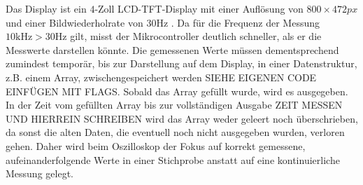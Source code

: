 Das Display ist ein $4$-Zoll LCD-TFT-Display mit einer Auflösung von \newline $800 \times 472 \si{px}$
und einer Bildwiederholrate von 30\si{\hertz} \cite{MikroControllerDatasheet_1}.
Da für die Frequenz der Messung $10 \si{\kilo\hertz} > 30 \si{\hertz}$ gilt,
misst der Mikrocontroller deutlich schneller, als er die Messwerte darstellen könnte.
Die gemessenen Werte müssen dementsprechend zumindest temporär, bis zur Darstellung auf dem Display,
in einer Datenstruktur, z.B. einem Array, zwischengespeichert werden SIEHE EIGENEN CODE EINFÜGEN MIT FLAGS.
Sobald das Array gefüllt wurde, wird es ausgegeben. In der Zeit vom gefüllten Array bis zur
vollständigen Ausgabe ZEIT MESSEN UND HIERREIN SCHREIBEN wird das Array weder geleert noch überschrieben,
da sonst die alten Daten, die eventuell noch nicht ausgegeben wurden, verloren gehen.
Daher wird beim Oszilloskop der Fokus auf korrekt gemessene, aufeinanderfolgende Werte in einer
Stichprobe anstatt auf eine kontinuierliche Messung gelegt.

